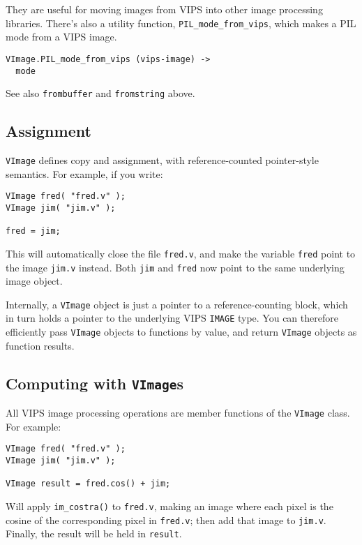 They are useful for moving images from VIPS into other image processing
libraries. There's also a utility function, \verb+PIL_mode_from_vips+, which
makes a PIL mode from a VIPS image.

\begin{verbatim}
VImage.PIL_mode_from_vips (vips-image) -> 
  mode
\end{verbatim}

See also \verb+frombuffer+ and \verb+fromstring+ above.

\subsection{Assignment}

\verb+VImage+ defines copy and assignment, with reference-counted
pointer-style semantics.  For example, if you write:

\begin{verbatim}
VImage fred( "fred.v" );
VImage jim( "jim.v" );

fred = jim;
\end{verbatim}

This will automatically close the file \verb+fred.v+, and make the variable
\verb+fred+ point to the image \verb+jim.v+ instead. Both \verb+jim+ and
\verb+fred+ now point to the same underlying image object. 

Internally, a \verb+VImage+ object is just a pointer to a reference-counting
block, which in turn holds a pointer to the underlying VIPS \verb+IMAGE+ type.
You can therefore efficiently pass \verb+VImage+ objects to functions by
value, and return \verb+VImage+ objects as function results.

\subsection{Computing with \texttt{VImage}s}
\label{sec:compute}

All VIPS image processing operations are member functions of the \verb+VImage+
class. For example:

\begin{verbatim}
VImage fred( "fred.v" );
VImage jim( "jim.v" );

VImage result = fred.cos() + jim;
\end{verbatim}

Will apply \verb+im_costra()+ to \verb+fred.v+, making an image where each
pixel is the cosine of the corresponding pixel in \verb+fred.v+; then add that
image to \verb+jim.v+. Finally, the result will be held in \verb+result+.


